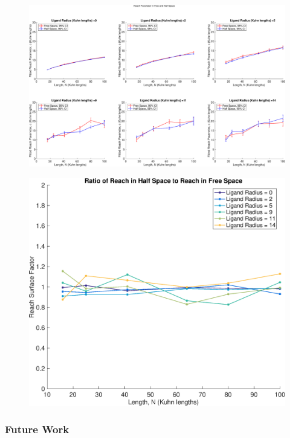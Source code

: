 \documentclass[../../AdvancementSummary.tex]{subfiles}
\begin{document}
\begin{figure}[H]
    \begin{center}
        		\includegraphics[width=\linewidth]{ResultsFigures/ReachSurfaceFactor/ReachParameterFreeHalfAxisEqual.eps}
        \caption{}
    \end{center}
\end{figure}

\begin{figure}[H]
    \begin{center}
        		\includegraphics[width=0.7\linewidth]{ResultsFigures/ReachSurfaceFactor/ReachSurfaceFactor.eps}
        \caption{}
    \end{center}
\end{figure}


\subsubsection{Future Work}
\end{document}
